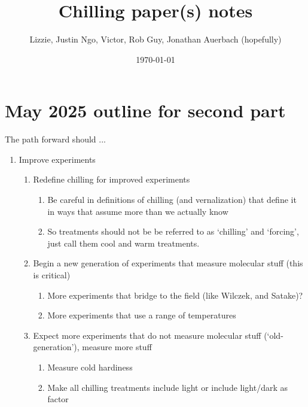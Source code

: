 \documentclass[11pt,letter]{article}
\begin{document}

\renewcommand{\refname}{\CHead{}}

\title{Chilling paper(s) notes}
\author{Lizzie, Justin Ngo, Victor, Rob Guy, Jonathan Auerbach (hopefully)} 
\date{\today}
\maketitle
\tableofcontents
\section{May 2025 outline for second part} 




The path forward should ...
\begin{enumerate}
\item Improve experiments
\begin{enumerate}
\item Redefine chilling for improved experiments
\begin{enumerate}
\item Be careful in definitions of chilling (and vernalization) that define it in ways that assume more than we actually know 
\item So treatments should not be be referred to as `chilling' and `forcing', just call them cool and warm treatments. 
\end{enumerate}
\item Begin a new generation of experiments that measure molecular stuff (this is critical)
\begin{enumerate}
\item More experiments that bridge to the field (like Wilczek, and Satake)?
\item More experiments that use a range of temperatures 
\end{enumerate}
\item Expect more experiments that do not measure molecular stuff (`old-generation'), measure more stuff
\begin{enumerate}
\item Measure cold hardiness
\item Make all chilling treatments include light or include light/dark as factor

\end{enumerate}
\end{enumerate}
\end{enumerate}
\end{document}
